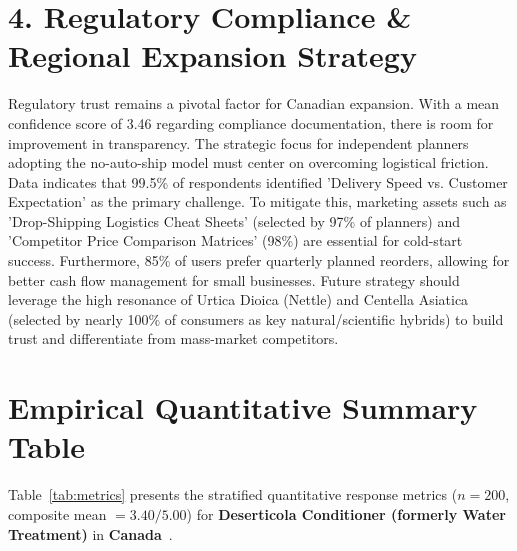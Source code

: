 \documentclass[10pt,twocolumn,a4paper]{article}
\begin{document}
\section{4. Regulatory Compliance \& Regional Expansion Strategy}
Regulatory trust remains a pivotal factor for Canadian expansion. With a mean confidence score of 3.46 regarding compliance documentation, there is room for improvement in transparency. The strategic focus for independent planners adopting the no-auto-ship model must center on overcoming logistical friction. Data indicates that 99.5\% of respondents identified 'Delivery Speed vs. Customer Expectation' as the primary challenge. To mitigate this, marketing assets such as 'Drop-Shipping Logistics Cheat Sheets' (selected by 97\% of planners) and 'Competitor Price Comparison Matrices' (98\%) are essential for cold-start success. Furthermore, 85\% of users prefer quarterly planned reorders, allowing for better cash flow management for small businesses. Future strategy should leverage the high resonance of Urtica Dioica (Nettle) and Centella Asiatica (selected by nearly 100\% of consumers as key natural/scientific hybrids) to build trust and differentiate from mass-market competitors.


\section{Empirical Quantitative Summary Table}
Table~\ref{tab:metrics} presents the stratified quantitative response metrics ($n = 200$, composite mean $= 3.40/5.00$) for \textbf{Deserticola Conditioner (formerly Water Treatment)} in \textbf{Canada}~\cite{ref_kaggle_doi,ref_hf_doi}.
\end{document}
